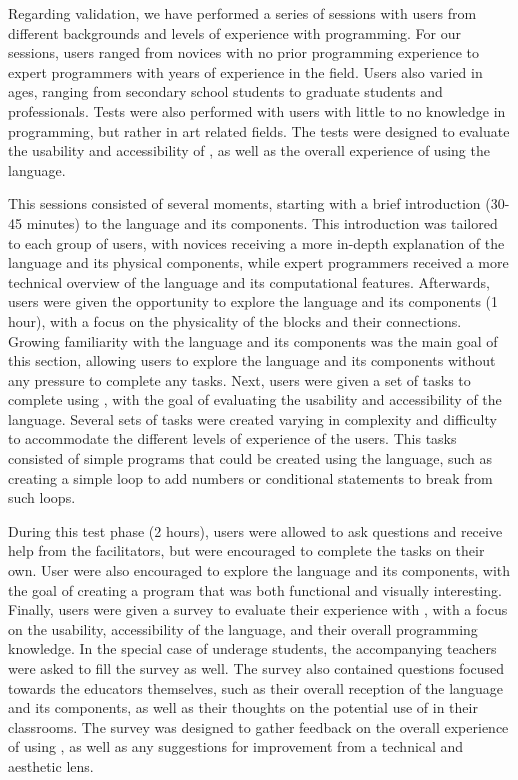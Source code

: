 Regarding validation, we have performed a series of sessions with users from different backgrounds and levels of experience with programming.
For our sessions, users ranged from novices with no prior programming experience to expert programmers with years of experience in the field.
Users also varied in ages, ranging from secondary school students to graduate students and professionals.
Tests were also performed with users with little to no knowledge in programming, but rather in art related fields.
The tests were designed to evaluate the usability and accessibility of \sculpt, as well as the overall experience of using the language.

This sessions consisted of several moments, starting with a brief introduction (30-45 minutes) to the language and its components.
This introduction was tailored to each group of users, with novices receiving a more in-depth explanation of the language and its physical components, while expert programmers received a more technical overview of the language and its computational features.
Afterwards, users were given the opportunity to explore the language and its components (1 hour), with a focus on the physicality of the blocks and their connections. Growing familiarity with the language and its components was the main goal of this section, allowing users to explore the language and its components without any pressure to complete any tasks.
Next, users were given a set of tasks to complete using \sculpt, with the goal of evaluating the usability and accessibility of the language.
Several sets of tasks were created varying in complexity and difficulty to accommodate the different levels of experience of the users.
This tasks consisted of simple programs that could be created using the language, such as creating a simple loop to add numbers or conditional statements to break from such loops.

During this test phase (2 hours), users were allowed to ask questions and receive help from the facilitators, but were encouraged to complete the tasks on their own.
User were also encouraged to explore the language and its components, with the goal of creating a program that was both functional and visually interesting.
Finally, users were given a survey to evaluate their experience with \sculpt, with a focus on the usability, accessibility of the language, and their overall programming knowledge.
In the special case of underage students, the accompanying teachers were asked to fill the survey as well.
The survey also contained questions focused towards the educators themselves, such as their overall reception of the language and its components, as well as their thoughts on the potential use of \sculpt in their classrooms.
The survey was designed to gather feedback on the overall experience of using \sculpt, as well as any suggestions for improvement from a technical and aesthetic lens.

